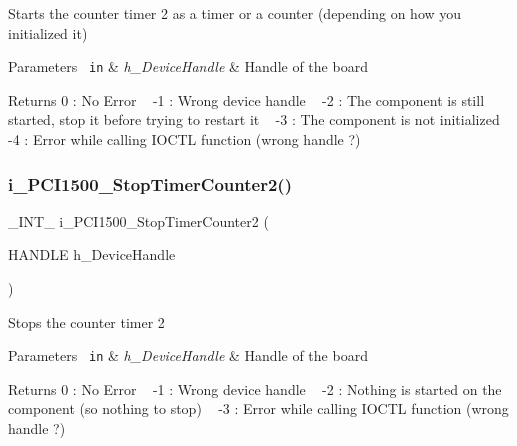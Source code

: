 Starts the counter timer 2 as a timer or a counter (depending on how you initialized it)


\begin{DoxyParams}[1]{Parameters}
\mbox{\texttt{ in}}  & {\em h\+\_\+\+Device\+Handle} & Handle of the board\\
\hline
\end{DoxyParams}
\begin{DoxyReturn}{Returns}
0 \+: No Error ~\newline
 -\/1 \+: Wrong device handle ~\newline
 -\/2 \+: The component is still started, stop it before trying to restart it ~\newline
 -\/3 \+: The component is not initialized ~\newline
 -\/4 \+: Error while calling I\+O\+C\+TL function (wrong handle ?) ~\newline

\end{DoxyReturn}
\mbox{\label{group___timer2_ga3de61f65cc00dc5a002bec74add4f647}} 
\subsubsection{\texorpdfstring{i\_PCI1500\_StopTimerCounter2()}{i\_PCI1500\_StopTimerCounter2()}}
{\footnotesize\ttfamily \+\_\+\+I\+N\+T\+\_\+ i\+\_\+\+P\+C\+I1500\+\_\+\+Stop\+Timer\+Counter2 (\begin{DoxyParamCaption}\item[{H\+A\+N\+D\+LE}]{h\+\_\+\+Device\+Handle }\end{DoxyParamCaption})}

Stops the counter timer 2


\begin{DoxyParams}[1]{Parameters}
\mbox{\texttt{ in}}  & {\em h\+\_\+\+Device\+Handle} & Handle of the board\\
\hline
\end{DoxyParams}
\begin{DoxyReturn}{Returns}
0 \+: No Error ~\newline
 -\/1 \+: Wrong device handle ~\newline
 -\/2 \+: Nothing is started on the component (so nothing to stop) ~\newline
 -\/3 \+: Error while calling I\+O\+C\+TL function (wrong handle ?) ~\newline

\end{DoxyReturn}
\mbox{\label{group___timer2_ga4a27cc728f1fc728bda7fcad39d458b8}} 
